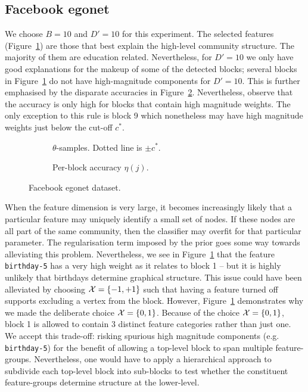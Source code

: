 \subsection{Facebook egonet}

We choose $B=10$ and $D'=10$ for this experiment. The selected features 
(Figure~\ref{fig:fb-null}) are those that best explain the high-level 
community structure. The majority of them are education related. 
Nevertheless, for $D'=10$ we only have good explanations for the makeup 
of some of the detected blocks; several blocks in 
Figure~\ref{fig:fb-null} do not have high-magnitude components for $D'=10$. This is further emphasised by the disparate accuracies in Figure~\ref{fig:fb-accuracy}. Nevertheless, observe that the accuracy is only high for blocks that contain high magnitude weights. The only exception to this rule is block 9 which nonetheless may have high magnitude weights just below the cut-off $c^*$.
%
\begin{figure}[!h]
	\centering
	\begin{subfigure}[t]{0.45\linewidth}
		\centering
		\caption{$\theta$-samples. Dotted line is $\pm c^*$.}
		\label{fig:fb-null}
	\end{subfigure}
	\begin{subfigure}[t]{0.45\linewidth}
		\centering
		\caption{Per-block accuracy $\eta(j)$.}
		\label{fig:fb-accuracy}
	\end{subfigure}
	\caption{Facebook egonet dataset.}
	\label{fig:fb}
\end{figure}

When the feature dimension is very large, it becomes increasingly likely that 
a particular feature may uniquely identify a small set of nodes. If these nodes 
are all part of the same community, then the classifier may overfit for that 
particular parameter. The regularisation term imposed by the prior goes some 
way towards alleviating this problem. Nevertheless, we see in 
Figure~\ref{fig:fb-null} that the feature \verb*|birthday-5| has a very 
high weight as it relates to block 1 -- but it is highly unlikely
that birthdays determine graphical structure. This issue could have been alleviated by 
choosing $\mathcal{X}=\{-1, +1\}$ such that having a feature turned off supports excluding 
a vertex from the block. However, Figure~\ref{fig:fb-null} demonstrates why we made 
the deliberate choice $\mathcal{X}=\{0,1\}$. 
Because of the choice $\mathcal{X}=\{0,1\}$, block 1 is allowed to contain 3 distinct feature 
categories rather than just one. We accept this trade-off: risking spurious high magnitude 
components (e.g. \verb*|birthday-5|) for the benefit of allowing a top-level block to span 
multiple feature-groups. Nevertheless, one would have to apply a hierarchical approach 
to subdivide each top-level block into sub-blocks to test whether the constituent 
feature-groups determine structure at the lower-level.


